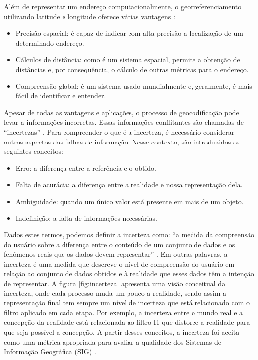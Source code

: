 Além de representar um endereço computacionalmente, o georreferenciamento utilizando latitude e longitude oferece várias vantagens \cite{longley2013}:

\begin{itemize}
   \item Precisão espacial: é capaz de indicar com alta precisão a localização de um determinado endereço.
   \item Cálculos de distância: como é um sistema espacial, permite a obtenção de distâncias e, por consequência, o cálculo de outras métricas para o endereço.
   \item Compreensão global: é um sistema usado mundialmente e, geralmente, é mais fácil de identificar e entender.
\end{itemize}

Apesar de todas as vantagens e aplicações, o processo de geocodificação pode levar a informações incorretas. Essas informações conflitantes são chamadas de ``incertezas'' \cite{longley2013}. Para compreender o que é a incerteza, é necessário considerar outros aspectos das falhas de informação. Nesse contexto, são introduzidos os seguintes conceitos:

\begin{itemize}
   \item Erro: a diferença entre a referência e o obtido.
   \item Falta de acurácia: a diferença entre a realidade e nossa representação dela.
   \item Ambiguidade: quando um único valor está presente em mais de um objeto.
   \item Indefinição: a falta de informações necessárias.
\end{itemize}

Dados estes termos, podemos definir a incerteza como: ``a medida da compreensão do usuário sobre a diferença entre o conteúdo de um conjunto de dados e os fenômenos reais que os dados devem representar'' \cite{longley2013}. Em outras palavras, a incerteza é uma medida que descreve o nível de compreensão do usuário em relação ao conjunto de dados obtidos e à realidade que esses dados têm a intenção de representar. A figura \ref{fig:incerteza} apresenta uma visão conceitual da incerteza, onde cada processo muda um pouco a realidade, sendo assim a representação final tem sempre um nível de incerteza que está relacionado com o filtro aplicado em cada etapa. Por exemplo, a incerteza entre o mundo real e a concepção da realidade está relacionada ao filtro I1 que distorce a realidade para que seja possível a concepção.  A partir desses conceitos, a incerteza foi aceita como uma métrica apropriada para avaliar a qualidade dos Sistemas de Informação Geográfica (SIG) \cite{longley2013}.

